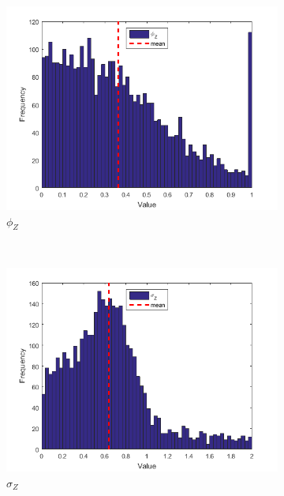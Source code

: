 \documentclass[11pt,a4,twosided,singlespacing,titlepagenumber=on]{scrreprt}
\numberwithin{equation}{chapter} %
\theoremstyle{remark}
\begin{document}
\begin{figure}[H]
\begin{subfigure}[t]{0.32\textwidth}
        \includegraphics[width=1\textwidth]{res/params/5114_5845/3}
        \caption{$\phi_Z$}
    \end{subfigure} \\
    \begin{subfigure}[t]{0.32\textwidth}
        \centering
        \includegraphics[width=1\textwidth]{res/params/5114_5845/4}
        \caption{$\sigma_Z$}
    \end{subfigure}
    \begin{subfigure}[t]{0.32\textwidth}
        \centering

\end{subfigure}
\end{figure}
\end{document}
